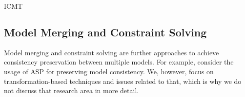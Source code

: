 \begin{copiedFrom}{ICMT}
\subsection*{Model Merging and Constraint Solving} 
Model merging and constraint solving are further approaches to achieve consistency preservation between multiple models.
For example, \textcite{eramo2008a} consider the usage of \ac{ASP} for preserving model consistency.
We, however, focus on transformation-based techniques and issues related to that,
which is why we do not discuss that research area in more detail.


\end{copiedFrom} %


